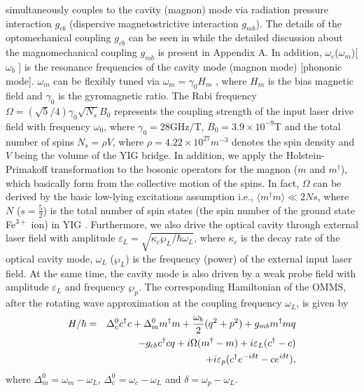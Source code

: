 \documentclass[aps,pra,superscriptaddress,balancelastpage,twocolumn]{revtex4}
\begin{document}
simultaneously couples to the cavity (magnon) mode via radiation pressure
interaction $g_{cb}$ (dispersive magnetostrictive interaction $g_{mb}$). The
details of the optomechanical coupling $g_{cb}$ can be seen in \cite{CGEN}
while the detailed discussion about the magnomechanical coupling $g_{mb}$ is
present in Appendix A. In addition, $\omega _{c}$($\omega _{m}$)[$\omega_{b}$%
] is the resonance frequencies of the cavity mode (magnon mode) [phononic
mode]. $\omega _{m}$ can be flexibly tuned via $\omega _{m}=\gamma _{0}H_{m}$%
, where $H_{m}$ is the bias magnetic field and $\gamma _{0}$ is the
gyromagnetic ratio. The Rabi frequency $\Omega =\left( \sqrt{5}/4\right)
\gamma _{0}\sqrt{N_{s}}B_{0} $ \cite{Jiee} represents the coupling strength
of the input laser drive field with frequency $\omega _{0}$, where $\gamma
_{0}=28$GHz/T, $B_{0}=3.9\times 10^{-9}$T and the total number of spins $%
N_{s}=\rho V$, where $\rho =4.22\times 10^{27}m^{-3}$ denotes the spin
density and $V$ being the volume of the YIG bridge. In addition, we apply
the Holstein-Primakoff transformation to the bosonic operators for the
magnon ($m$ and $m^{\dagger }$), which basically form from the collective
motion of the spins. In fact, $\Omega $ can be derived by the basic
low-lying excitations assumption i.e., $\langle m^{\dagger }m\rangle \ll 2Ns
$, where $N$ ($s=\frac{5}{2}$) is the total number of spin states (the spin
number of the ground state Fe$^{3+}$ ion) in YIG \cite{Holstein}.
Furthermore, we also drive the optical cavity through external laser field
with amplitude $\varepsilon_{L} =\sqrt{\kappa _{c}\wp _{L}/\hbar \omega _{L}}
$, where $\kappa _{c}$ is the decay rate of the optical cavity mode, $\omega
_{L}$ ($\wp _{L}$) is the frequency (power) of the external input laser
field. At the same time, the cavity mode is also driven by a weak probe
field with amplitude $\varepsilon_{L}$ and frequency $\wp _{p}$. The
corresponding Hamiltonian of the OMMS, after the rotating wave approximation
at the coupling frequency $\omega _{L}$, is given by
\begin{eqnarray}
H/\hbar &=&\Delta _{c}^{0}c^{\dag }c+\Delta _{m}^{0}m^{\dag }m+\frac{\omega
_{b}}{2}(q^{2}+p^{2})+g_{mb}m^{\dag }mq  \notag \\
&&-g_{cb}c^{\dagger }cq+i\Omega (m^{\dag }-m)+i\varepsilon _{L}(c^{\dagger
}-c)  \notag \\
&&+i\varepsilon _{p}(c^{\dagger }e^{-i\delta t}-ce^{i\delta t}),
\end{eqnarray}%
where $\Delta _{m}^{0}=\omega _{m}-\omega _{L}$, $\Delta _{c}^{0}=\omega
_{c}-\omega _{L}$ and $\delta =\omega _{p}-\omega _{L}$.
\end{document}
